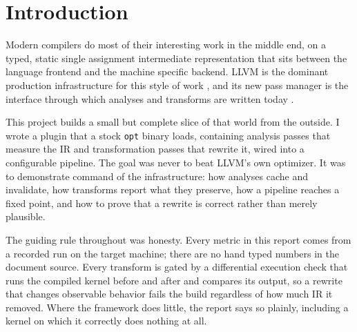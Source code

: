 \section{Introduction}

Modern compilers do most of their interesting work in the middle end, on a
typed, static single assignment intermediate representation that sits between the
language frontend and the machine specific backend. LLVM is the dominant
production infrastructure for this style of work \cite{lattner2004llvm}, and its
new pass manager is the interface through which analyses and transforms are
written today \cite{llvm_writing_pass}.

This project builds a small but complete slice of that world from the outside. I
wrote a plugin that a stock \texttt{opt} binary loads, containing analysis passes
that measure the IR and transformation passes that rewrite it, wired into a
configurable pipeline. The goal was never to beat LLVM's own optimizer. It was to
demonstrate command of the infrastructure: how analyses cache and invalidate,
how transforms report what they preserve, how a pipeline reaches a fixed point,
and how to prove that a rewrite is correct rather than merely plausible.

The guiding rule throughout was honesty. Every metric in this report comes from a
recorded run on the target machine; there are no hand typed numbers in the
document source. Every transform is gated by a differential execution check that
runs the compiled kernel before and after and compares its output, so a rewrite
that changes observable behavior fails the build regardless of how much IR it
removed. Where the framework does little, the report says so plainly, including a
kernel on which it correctly does nothing at all.
